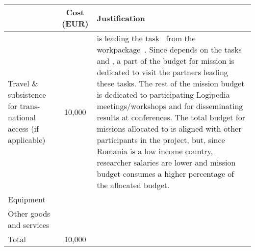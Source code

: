 \begin{longtable*}{|p{.25\textwidth}|c|p{0.55\textwidth}|}
\hline
   & Cost (EUR)  & Justification \\
  \hline
  Travel \& subsistence for trans-national access (if applicable) & 10,000 &

   is leading the task~ from the
workpackage~.
Since  depends on the
tasks~ and ,
a part of the budget for mission is dedicated to visit the partners leading
these tasks.  The rest of the mission budget is dedicated to
 participating Logipedia meetings/workshops
 and for disseminating results at conferences.
 The total budget for missions allocated to
 is aligned with other participants in the
project, but, since Romania is a low income country, researcher salaries
are lower and mission budget consumes a higher percentage of the
allocated budget.
  \\
  \hline
  Equipment & & \\
  \hline
  Other goods and services & & \\
  \hline
  Total & 10,000 & \\
  \hline
\end{longtable*}


